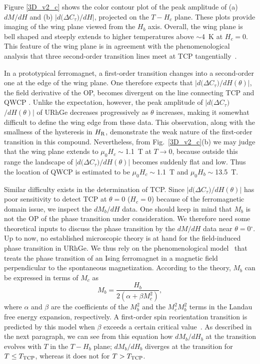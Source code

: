 \documentclass[twocolumn, aps, superscriptaddress, amsfonts,floatfix]{revtex4}%
\begin{document}
{Figure \ref{3D_v2_c} shows the color contour plot of the peak amplitude of (a) $dM/dH$ and (b) $|d(\Delta$$C_{\tau})$$/dH|$, projected on the $T-H_c$ plane. 
These plots  provide imaging of the wing plane viewed from the $H_b$ axis. 
Overall, the wing plane is bell shaped and steeply extends to higher temperatures above $\sim$4~K  at $H_c=0$. This feature of the wing plane is in agreement with the phenomenological analysis that three second-order transition lines meet at TCP tangentially~\cite{PhysRevB.94.060410}.

In a prototypical ferromagnet,  a first-order transition changes into a second-order one at the edge of the wing plane. One therefore expects that $|d(\Delta$$C_{\tau})$$/dH(\theta)|$, the field derivative of the OP, becomes divergent on the line connecting TCP and QWCP \cite{PhysRevB.86.024428}. 
Unlike the expectation, however, the peak amplitude of $|d(\Delta$$C_{\tau})$$/dH(\theta)|$ of URhGe decreases progressively as $\theta$ increases, making it somewhat difficult to define the wing edge from these data. This observation, along with the smallness of the hysteresis in $H_{\rm R}$, demonstrate the weak nature of the first-order transition in this compound.
Nevertheless, from Fig.~\ref{3D_v2_c}(b) we may judge that the wing plane extends to $\mu_0H_c\sim$1.1~T at $T\rightarrow 0$, because outside this range the landscape of $|d(\Delta$$C_{\tau})$$/dH(\theta)|$ becomes suddenly flat and low. Thus the location of  QWCP is estimated to be $\mu_0H_c\sim$1.1~T and $\mu_0H_b\sim$13.5~T.


Similar difficulty exists in the determination of TCP. Since $|d(\Delta$$C_{\tau})$$/dH(\theta)|$ has poor sensitivity to detect TCP at $\theta=0$ ($H_c=0$) because of the ferromagnetic domain issue, we inspect the $dM_b/dH$ data. One should keep in mind that $M_b$ is not the OP of the phase transition under consideration. We therefore need some theoretical inputs to discuss the phase transition by the $dM/dH$ data near $\theta=0$$^\circ$.
Up to now, no established microscopic theory is at hand for the field-induced phase transition in URhGe. We thus rely on the phenomenological model~\cite{PhysRevB.91.014506} that treats the phase transition of an Ising ferromagnet in a magnetic field perpendicular to the spontaneous magnetization. According to the theory, $M_b$ can be expressed in terms of $M_c$ as
\begin{equation}
M_b=\frac{H_b}{2(\alpha+\beta M_c^2)},
\end{equation}
where $\alpha$ and $\beta$ are the coefficients of the $M_b^2$ and the $M_c^2M_b^2$ terms in the Landau free energy expansion, respectively. 
A first-order spin reorientation transition is predicted by this model when $\beta$ exceeds a certain critical value~\cite{PhysRevB.91.014506}.
As described in the next paragraph, we can see from this equation how $dM_b/dH_b$ at the transition evolves with $T$ in the $T-H_b$ plane; $dM_b/dH_b$ diverges at the transition for $T\leq T_{\rm TCP}$, whereas it does not for $T> T_{\rm TCP}$.

}
\end{document}
